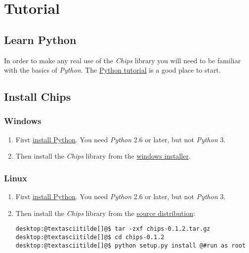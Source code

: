 \documentclass[letterpaper,10pt,english]{sphinxmanual}
\begin{document}
\section{Tutorial}
\label{tutorial/index::doc}\label{tutorial/index:tutorial}

\subsection{Learn Python}
\label{tutorial/index:learn-python}
In order to make any real use of the \emph{Chips} library you will need to be
familiar with the basics of \emph{Python}. The \href{http://docs.python.org/tut}{Python tutorial} is a good place
to start.


\subsection{Install Chips}
\label{tutorial/index:python-tutorial}\label{tutorial/index:install-chips}

\subsubsection{Windows}
\label{tutorial/index:windows}\begin{enumerate}
\item {} 
First \href{http://python.org/download}{install Python}. You need \emph{Python} 2.6 or later, but not \emph{Python} 3.

\item {} 
Then install the \emph{Chips} library from the \href{https://github.com/downloads/dawsonjon/chips/Chips-0.1.2.win32.exe}{windows installer}.

\end{enumerate}


\subsubsection{Linux}
\label{tutorial/index:linux}\begin{enumerate}
\item {} 
First \href{http://python.org/download}{install Python}. You need \emph{Python} 2.6 or later, but not \emph{Python} 3.

\item {} 
Then install the \emph{Chips} library from the \href{https://github.com/downloads/dawsonjon/chips/Chips-0.1.2.tar.gz}{source distribution}:

\begin{Verbatim}[commandchars=@\[\]]
desktop:@textasciitilde[]@$ tar -zxf chips-0.1.2.tar.gz
desktop:@textasciitilde[]@$ cd chips-0.1.2
desktop:@textasciitilde[]@$ python setup.py install @#run as root
\end{Verbatim}

\end{enumerate}
\end{document}
